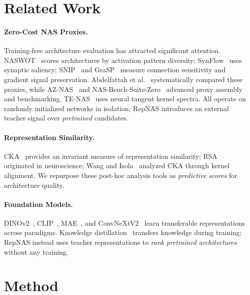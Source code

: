\documentclass[10pt,twocolumn,letterpaper]{article}
\begin{document}
\section{Related Work}
\label{sec:related}

\paragraph{Zero-Cost NAS Proxies.}
Training-free architecture evaluation has attracted significant attention.
NASWOT~\cite{mellor2021naswot} scores architectures by activation pattern diversity; SynFlow~\cite{tanaka2020synflow} uses synaptic saliency; SNIP~\cite{lee2019snip} and GraSP~\cite{wang2020grasp} measure connection sensitivity and gradient signal preservation.
Abdelfattah et al.~\cite{abdelfattah2021zerocost} systematically compared these proxies, while AZ-NAS~\cite{lee2024aznas} and NAS-Bench-Suite-Zero~\cite{krishnakumar2022nasbenchsuitezero} advanced proxy assembly and benchmarking.
TE-NAS~\cite{chen2021tenas} uses neural tangent kernel spectra.
All operate on randomly initialized networks in isolation; RepNAS introduces an external teacher signal over \emph{pretrained} candidates.

\paragraph{Representation Similarity.}
CKA~\cite{kornblith2019cka} provides an invariant measure of representation similarity; RSA~\cite{kriegeskorte2008rsa} originated in neuroscience; Wang and Isola~\cite{wang2020understanding} analyzed CKA through kernel alignment.
We repurpose these post-hoc analysis tools as \emph{predictive scores} for architecture quality.

\paragraph{Foundation Models.}
DINOv2~\cite{oquab2024dinov2}, CLIP~\cite{radford2021clip}, MAE~\cite{he2022mae}, and ConvNeXtV2~\cite{woo2023convnextv2} learn transferable representations across paradigms.
Knowledge distillation~\cite{hinton2015distilling} transfers knowledge during training; RepNAS instead uses teacher representations to \emph{rank pretrained architectures} without any training.


\section{Method}
\label{sec:method}
\end{document}
